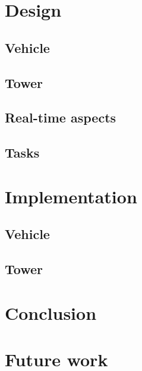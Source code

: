 \chapter{Design}
\label{DesignSec}
\section{Vehicle}
\label{vehicledesign}
\section{Tower}
\label{towerdesign}
\section{Real-time aspects}
\section{Tasks}
\label{sect:dtasks}






\chapter{Implementation}
\label{chap:impl}
\section{Vehicle}
\section{Tower}





\chapter{Conclusion}

\chapter{Future work}


